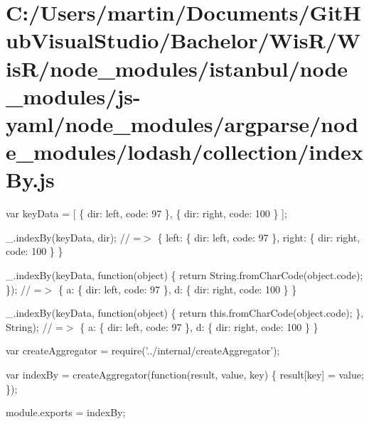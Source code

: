 \hypertarget{_c_1_2_users_2martin_2_documents_2_git_hub_visual_studio_2_bachelor_2_wis_r_2_wis_r_2node_moduleb5a68885a67a6e4a2186a62e4c965baf}{}\section{C\+:/\+Users/martin/\+Documents/\+Git\+Hub\+Visual\+Studio/\+Bachelor/\+Wis\+R/\+Wis\+R/node\+\_\+modules/istanbul/node\+\_\+modules/js-\/yaml/node\+\_\+modules/argparse/node\+\_\+modules/lodash/collection/index\+By.\+js}
var key\+Data = \mbox{[} \{ \textquotesingle{}dir\textquotesingle{}\+: \textquotesingle{}left\textquotesingle{}, \textquotesingle{}code\textquotesingle{}\+: 97 \}, \{ \textquotesingle{}dir\textquotesingle{}\+: \textquotesingle{}right\textquotesingle{}, \textquotesingle{}code\textquotesingle{}\+: 100 \} \mbox{]};

\+\_\+.\+index\+By(key\+Data, \textquotesingle{}dir\textquotesingle{}); // =$>$ \{ \textquotesingle{}left\textquotesingle{}\+: \{ \textquotesingle{}dir\textquotesingle{}\+: \textquotesingle{}left\textquotesingle{}, \textquotesingle{}code\textquotesingle{}\+: 97 \}, \textquotesingle{}right\textquotesingle{}\+: \{ \textquotesingle{}dir\textquotesingle{}\+: \textquotesingle{}right\textquotesingle{}, \textquotesingle{}code\textquotesingle{}\+: 100 \} \}

\+\_\+.\+index\+By(key\+Data, function(object) \{ return String.\+from\+Char\+Code(object.\+code); \}); // =$>$ \{ \textquotesingle{}a\textquotesingle{}\+: \{ \textquotesingle{}dir\textquotesingle{}\+: \textquotesingle{}left\textquotesingle{}, \textquotesingle{}code\textquotesingle{}\+: 97 \}, \textquotesingle{}d\textquotesingle{}\+: \{ \textquotesingle{}dir\textquotesingle{}\+: \textquotesingle{}right\textquotesingle{}, \textquotesingle{}code\textquotesingle{}\+: 100 \} \}

\+\_\+.\+index\+By(key\+Data, function(object) \{ return this.\+from\+Char\+Code(object.\+code); \}, String); // =$>$ \{ \textquotesingle{}a\textquotesingle{}\+: \{ \textquotesingle{}dir\textquotesingle{}\+: \textquotesingle{}left\textquotesingle{}, \textquotesingle{}code\textquotesingle{}\+: 97 \}, \textquotesingle{}d\textquotesingle{}\+: \{ \textquotesingle{}dir\textquotesingle{}\+: \textquotesingle{}right\textquotesingle{}, \textquotesingle{}code\textquotesingle{}\+: 100 \} \}


\begin{DoxyCodeInclude}
var createAggregator = require(\textcolor{stringliteral}{'../internal/createAggregator'});

var indexBy = createAggregator(\textcolor{keyword}{function}(result, value, key) \{
  result[key] = value;
\});

module.exports = indexBy;
\end{DoxyCodeInclude}
 